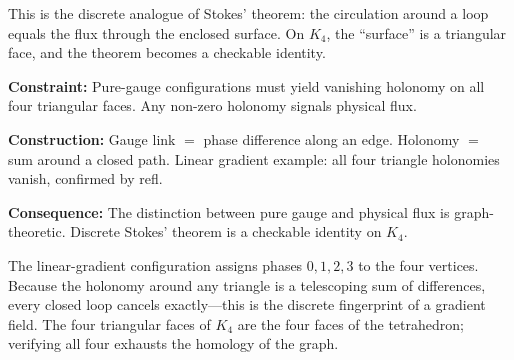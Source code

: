 \documentclass[11pt,a4paper]{book}
\def\texttt#1{#1}%
\begin{document}
This is the discrete analogue of Stokes' theorem: the circulation around a loop equals the flux through the enclosed surface. On $K_4$, the ``surface'' is a triangular face, and the theorem becomes a checkable identity.

\textbf{Constraint:} Pure-gauge configurations must yield vanishing holonomy on all four triangular faces. Any non-zero holonomy signals physical flux.

\textbf{Construction:} Gauge link $=$ phase difference along an edge. Holonomy $=$ sum around a closed path. Linear gradient example: all four triangle holonomies vanish, confirmed by \texttt{refl}.

\textbf{Consequence:} The distinction between pure gauge and physical flux is graph-theoretic. Discrete Stokes' theorem is a checkable identity on $K_4$.


The linear-gradient configuration assigns phases $0, 1, 2, 3$ to the
four vertices. Because the holonomy around any triangle is a telescoping
sum of differences, every closed loop cancels exactly---this is the
discrete fingerprint of a gradient field. The four triangular faces of
$K_4$ are the four faces of the tetrahedron; verifying all four
exhausts the homology of the graph.
\end{document}
